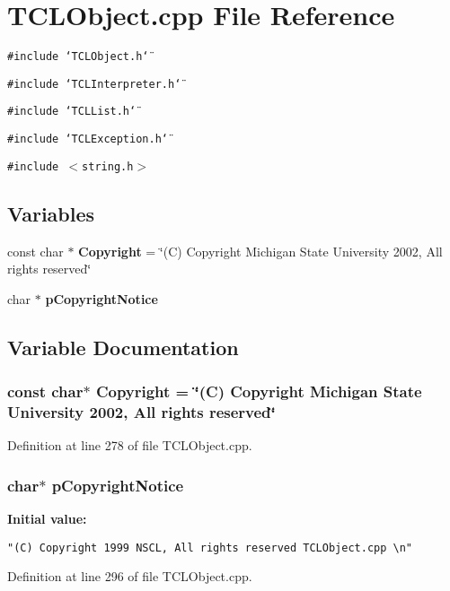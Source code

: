 \section{TCLObject.cpp File Reference}
\label{TCLObject_8cpp}
{\tt \#include \char`\"{}TCLObject.h\char`\"{}}\par
{\tt \#include \char`\"{}TCLInterpreter.h\char`\"{}}\par
{\tt \#include \char`\"{}TCLList.h\char`\"{}}\par
{\tt \#include \char`\"{}TCLException.h\char`\"{}}\par
{\tt \#include $<$string.h$>$}\par
\subsection*{Variables}
\begin{CompactItemize}
\item 
const char $\ast$ {\bf Copyright} = \char`\"{}(C) Copyright Michigan State University 2002, All rights reserved\char`\"{}
\item 
char $\ast$ {\bf p\-Copyright\-Notice}
\end{CompactItemize}


\subsection{Variable Documentation}
\subsubsection{\setlength{\rightskip}{0pt plus 5cm}const char$\ast$ Copyright = \char`\"{}(C) Copyright Michigan State University 2002, All rights reserved\char`\"{}\hspace{0.3cm}{\tt  [static]}}\label{TCLObject_8cpp_a0}




Definition at line 278 of file TCLObject.cpp.
\subsubsection{\setlength{\rightskip}{0pt plus 5cm}char$\ast$ p\-Copyright\-Notice\hspace{0.3cm}{\tt  [static]}}\label{TCLObject_8cpp_a1}


{\bf Initial value:}

\footnotesize\begin{verbatim} 
"(C) Copyright 1999 NSCL, All rights reserved TCLObject.cpp \n"\end{verbatim}\normalsize 


Definition at line 296 of file TCLObject.cpp.